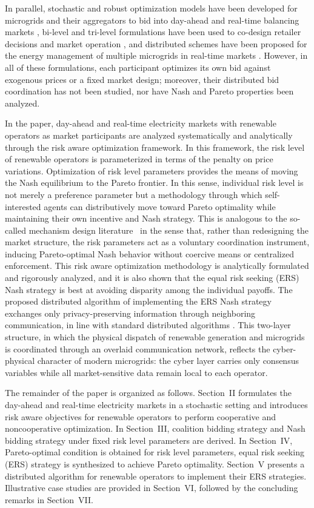 \documentclass[journal]{IEEEtran}
\begin{document}
In parallel, stochastic and robust optimization models have been developed for microgrids and their aggregators to bid into day-ahead and real-time balancing markets \cite{7273948, 7393823, 8554122}, bi-level and tri-level formulations have been used to co-design retailer decisions and market operation \cite{9018247, 10908096}, and distributed schemes have been proposed for the energy management of multiple microgrids in real-time markets \cite{8141420}. However, in all of these formulations, each participant optimizes its own bid against exogenous prices or a fixed market design; moreover, their distributed bid coordination has not been studied, nor have Nash and Pareto properties been analyzed. 

In the paper, day-ahead and real-time electricity markets with renewable operators as market participants are analyzed systematically and analytically through the risk aware optimization framework. In this framework, the risk level of renewable operators is parameterized in terms of the penalty on price variations. Optimization of risk level parameters provides the means of moving the Nash equilibrium to the Pareto frontier. In this sense, individual risk level is not merely a preference parameter but a methodology through which self-interested agents can distributively move toward Pareto optimality while maintaining their own incentive and Nash strategy. This is analogous to the so-called mechanism design literature~\cite{hurwicz1960optimality,myerson1979incentive} in the sense that,  rather than redesigning the market structure, the risk parameters act as a voluntary coordination instrument, inducing Pareto-optimal Nash behavior without coercive means or centralized enforcement. This risk aware optimization methodology is analytically formulated and rigorously analyzed, and it is also shown that the equal risk seeking (ERS) Nash strategy is best at avoiding disparity among the individual payoffs. The proposed distributed algorithm of implementing the ERS Nash strategy exchanges only privacy-preserving information through neighboring communication, in line with standard distributed algorithms \cite{qu, molzahn2017survey, yang2019survey}. This two-layer structure, in which the physical dispatch of renewable generation and microgrids is coordinated through an overlaid communication network, reflects the cyber-physical character of modern microgrids: the cyber layer carries only consensus variables while all market-sensitive data remain local to each operator.


The remainder of the paper is organized as follows. Section~II formulates the day-ahead and real-time electricity markets in a stochastic setting and introduces risk aware objectives for renewable operators to perform cooperative and noncooperative optimization. In Section~III, coalition bidding strategy and Nash bidding strategy under fixed risk level parameters are derived. In Section~IV, Pareto-optimal condition is obtained for risk level parameters, equal risk seeking (ERS) strategy is synthesized to achieve Pareto optimality. Section~V presents a distributed algorithm for renewable operators to implement their ERS strategies. Illustrative case studies are provided in Section~VI, followed by the concluding remarks in Section~VII.
\end{document}
